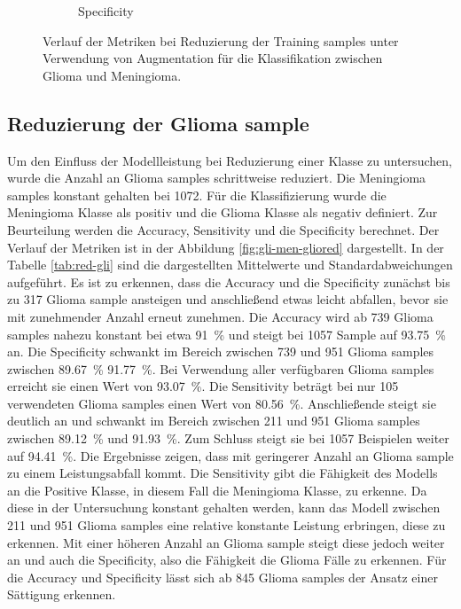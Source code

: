\begin{figure}[H]
\begin{subfigure}[b]{0.48\textwidth}
    \caption{Specificity}
    \label{fig:augm-spec}
  \end{subfigure}
  \caption{Verlauf der Metriken bei Reduzierung der Training samples unter Verwendung von Augmentation für die Klassifikation zwischen Glioma und Meningioma.}
  \label{fig:gli-men-augm}
\end{figure}
\subsection{Reduzierung der Glioma sample}
Um den Einfluss der Modellleistung bei Reduzierung einer Klasse zu untersuchen, wurde die Anzahl an Glioma samples schrittweise reduziert.
Die Meningioma samples konstant gehalten bei 1072.
Für die Klassifizierung wurde die Meningioma Klasse als positiv und die Glioma Klasse als negativ definiert. 
Zur Beurteilung werden die Accuracy, Sensitivity und die Specificity berechnet.
Der Verlauf der Metriken ist in der Abbildung \ref{fig:gli-men-gliored} dargestellt.
In der Tabelle \ref{tab:red-gli} sind die dargestellten Mittelwerte und Standardabweichungen aufgeführt. 
Es ist zu erkennen, dass die Accuracy und die Specificity zunächst bis zu 317 Glioma sample ansteigen und anschließend etwas leicht abfallen,
bevor sie mit zunehmender Anzahl erneut zunehmen. 
Die Accuracy wird ab 739 Glioma samples nahezu konstant bei etwa \SI{91}{\percent} und steigt bei 1057 Sample auf \SI{93.75}{\percent} an.
Die Specificity schwankt im Bereich zwischen 739 und 951 Glioma samples zwischen \SI{89.67}{\%} \SI{91.77}{\%}.
Bei Verwendung aller verfügbaren Glioma samples erreicht sie einen Wert von \SI{93.07}{\%}.
Die Sensitivity beträgt bei nur 105 verwendeten Glioma samples einen Wert von \SI{80.56}{\%}.
Anschließende steigt sie deutlich an und schwankt im Bereich zwischen 211 und 951 Glioma samples zwischen \SI{89.12}{\%} und \SI{91.93}{\%}. 
Zum Schluss steigt sie bei 1057 Beispielen weiter auf \SI{94.41}{\%}.
Die Ergebnisse zeigen, dass mit geringerer Anzahl an Glioma sample zu einem Leistungsabfall kommt.
Die Sensitivity gibt die Fähigkeit des Modells an die Positive Klasse, in diesem Fall die Meningioma Klasse, zu erkenne.
Da diese in der Untersuchung konstant gehalten werden, kann das Modell zwischen 211 und 951 Glioma samples eine relative konstante Leistung erbringen, diese zu erkennen.
Mit einer höheren Anzahl an Glioma sample steigt diese jedoch weiter an und auch die Specificity, also die Fähigkeit die Glioma Fälle zu erkennen.
Für die Accuracy und Specificity lässt sich ab 845 Glioma samples der Ansatz einer Sättigung erkennen. 
